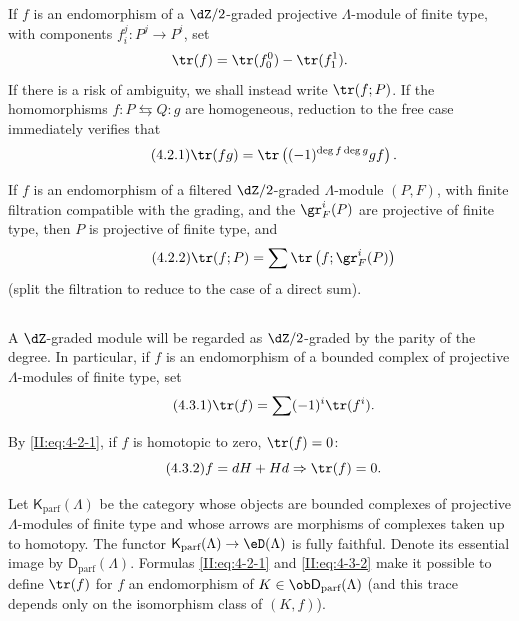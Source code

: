 If $f$ is an endomorphism of a $\dZ/2$-graded projective
$\Lambda$-module of finite type, with components $f_i^j:P^j\to P^i$, set
\[
  \tr(f) = \tr(f_0^0) - \tr(f_1^1) \text{.}
\]
If there is a risk of ambiguity, we shall instead write $\tr(f;P)$. If the
homomorphisms $f:P\leftrightarrows Q:g$ are homogeneous, reduction to the
free case immediately verifies that
\begin{equation*}\tag{4.2.1}\label{II:eq:4-2-1}
  \tr(f g) = \tr\left((-1)^{\deg f \deg g} g f\right) \text{.}
\end{equation*}

If $f$ is an endomorphism of a filtered $\dZ/2$-graded $\Lambda$-module
$(P,F)$, with finite filtration compatible with the grading, and the
$\gr_F^i(P)$ are projective of finite type, then $P$ is projective of finite
type, and
\begin{equation*}\tag{4.2.2}\label{II:eq:4-2-2}
  \tr(f;P) = \sum \tr\left(f; \gr_F^i(P) \right)
\end{equation*}
(split the filtration to reduce to the case of a direct sum).






\subsection{}\label{II:4-3}

A $\dZ$-graded module will be regarded as $\dZ/2$-graded by the parity of
the degree. In particular, if $f$ is an endomorphism of a bounded complex of
projective $\Lambda$-modules of finite type, set
\begin{equation*}\tag{4.3.1}\label{II:eq:4-3-1}
  \tr(f) = \sum (-1)^i \tr(f^i) \text{.}
\end{equation*}

By \eqref{II:eq:4-2-1}, if $f$ is homotopic to zero, $\tr(f) = 0$:
\begin{equation*}\tag{4.3.2}\label{II:eq:4-3-2}
  f = d H + H d \Rightarrow \tr(f) = 0 \text{.}
\end{equation*}

Let $\mathsf{K}_\text{parf}(\Lambda)$ be the category whose objects are
bounded complexes of projective $\Lambda$-modules of finite type and whose
arrows are morphisms of complexes taken up to homotopy. The functor
$\mathsf{K}_\text{parf}(\Lambda)\to\eD(\Lambda)$ is fully faithful. Denote its
essential image by $\mathsf{D}_\text{parf}(\Lambda)$. Formulas
\eqref{II:eq:4-2-1} and \eqref{II:eq:4-3-2} make it possible to define
$\tr(f)$ for $f$ an endomorphism of
$K\in\ob \mathsf{D}_\text{parf}(\Lambda)$ (and this trace depends only on the
isomorphism class of $(K,f)$).






